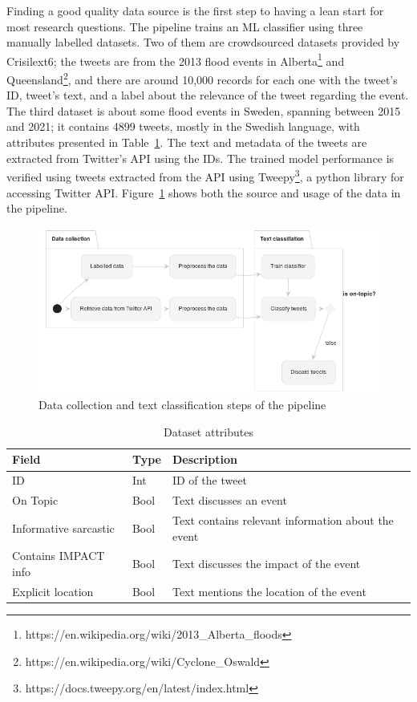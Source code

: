Finding a good quality data source is the first step to having a lean start for most research
questions. The pipeline trains an \ac{ML} classifier using three manually labelled datasets. Two of
them are crowdsourced datasets provided by Crisilext6; the tweets are from the 2013 flood events in
Alberta\footnote{https://en.wikipedia.org/wiki/2013\_Alberta\_floods} and
Queensland\footnote{https://en.wikipedia.org/wiki/Cyclone\_Oswald}, and there are around 10,000
records for each one with the tweet's ID, tweet's text, and a label about the relevance of the tweet
regarding the event. The third dataset is about some flood events in Sweden, spanning between 2015
and 2021; it contains 4899 tweets, mostly in the Swedish language, with attributes presented in
Table~\ref{tab:dataset_attr}. The text and metadata of the tweets are extracted from Twitter's API
using the IDs. The trained model performance is verified using tweets extracted from the API using
Tweepy\footnote{https://docs.tweepy.org/en/latest/index.html}, a python library for accessing
Twitter API. Figure~\ref{fig:flow_chart_data_collection_text_classification} shows both the source
and usage of the data in the pipeline.
\begin{figure}[H]
\begin{center}
  \includegraphics[width=\columnwidth]{./images/data_collection_text_classification.png}
\end{center}
\caption{Data collection and text classification steps of the pipeline}
\label{fig:flow_chart_data_collection_text_classification}
\end{figure}


\begin{table}
  \center
  \begin{tabular}{|l|l|l|}
    \hline
    Field & Type & Description \\
    \hline
    ID & Int & ID of the tweet\\
    \hline
    On Topic  & Bool & Text discusses an event \\
    \hline
    Informative sarcastic  & Bool & Text contains relevant information about the event \\
    \hline
    Contains IMPACT info & Bool & Text discusses the impact of the event \\
    \hline
    Explicit location & Bool & Text mentions the location of the event \\
    \hline
  \end{tabular}
  \caption{Dataset attributes}
  \label{tab:dataset_attr}
\end{table}

